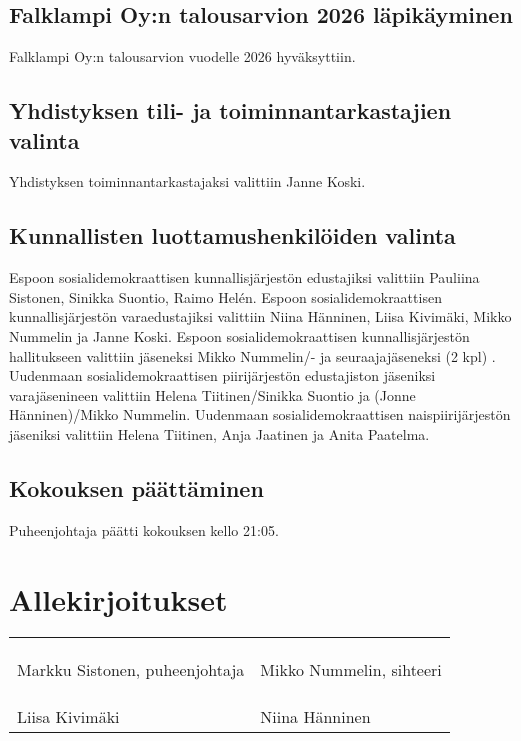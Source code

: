 \documentclass[a4paper,12pt]{article}
\begin{document}
\subsection{Falklampi Oy:n talousarvion 2026 läpikäyminen}
Falklampi Oy:n talousarvion vuodelle 2026 hyväksyttiin.
\subsection{Yhdistyksen tili- ja toiminnantarkastajien valinta}
Yhdistyksen toiminnantarkastajaksi valittiin Janne Koski.
\subsection{Kunnallisten luottamushenkilöiden valinta}
Espoon sosialidemokraattisen kunnallisjärjestön edustajiksi valittiin Pauliina Sistonen, Sinikka Suontio, Raimo Helén. Espoon sosialidemokraattisen kunnallisjärjestön varaedustajiksi valittiin Niina Hänninen, Liisa Kivimäki, Mikko Nummelin ja Janne Koski. Espoon sosialidemokraattisen kunnallisjärjestön hallitukseen valittiin jäseneksi Mikko Nummelin/- ja seuraajajäseneksi (2 kpl) . Uudenmaan sosialidemokraattisen piirijärjestön edustajiston jäseniksi varajäsenineen valittiin Helena Tiitinen/Sinikka Suontio ja (Jonne Hänninen)/Mikko Nummelin. Uudenmaan sosialidemokraattisen naispiirijärjestön jäseniksi valittiin Helena Tiitinen, Anja Jaatinen ja Anita Paatelma.
\subsection{Kokouksen päättäminen}
Puheenjohtaja päätti kokouksen kello 21:05.
\section*{Allekirjoitukset}
\begin{flushleft}
\begin{tabular}{ll}
& \\
& \\
& \\
Markku Sistonen, puheenjohtaja &
Mikko Nummelin, sihteeri \\
& \\
& \\
& \\
Liisa Kivimäki &
Niina Hänninen
\end{tabular}
\end{flushleft}
\end{document}
